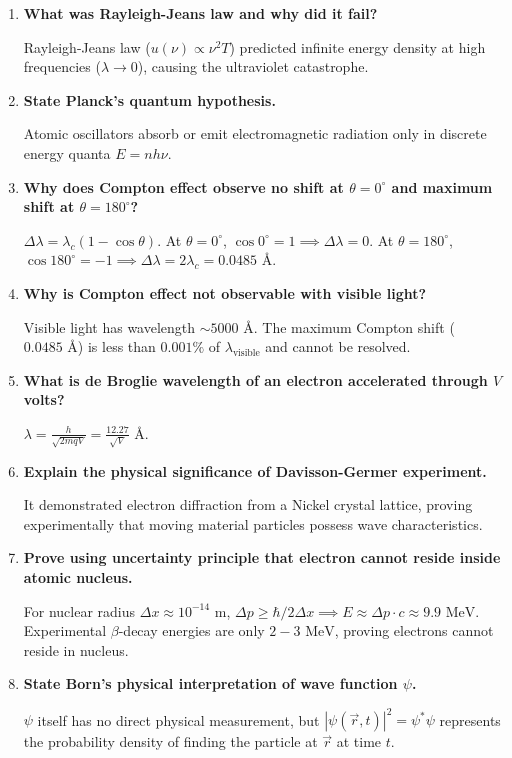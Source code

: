 \documentclass[12pt,a4paper]{article}
\newcommand{\Q}[1]{\textbf{#1}\par\noindent\ignorespaces}
\begin{document}
\begin{tcolorbox}[exambox, title={\textbf{Frequently Asked / Viva Questions}}]
\begin{enumerate}[topsep=0pt, label=\textbf{Q\arabic*.}, itemsep=5pt]
  \item \Q{What was Rayleigh-Jeans law and why did it fail?}
  Rayleigh-Jeans law ($u(\nu) \propto \nu^2 T$) predicted infinite energy density at high frequencies ($\lambda \to 0$), causing the ultraviolet catastrophe.

  \item \Q{State Planck's quantum hypothesis.}
  Atomic oscillators absorb or emit electromagnetic radiation only in discrete energy quanta $E = n h \nu$.

  \item \Q{Why does Compton effect observe no shift at $\theta = 0^\circ$ and maximum shift at $\theta = 180^\circ$?}
  $\Delta\lambda = \lambda_c (1 - \cos\theta)$. At $\theta = 0^\circ$, $\cos 0^\circ = 1 \implies \Delta\lambda = 0$. At $\theta = 180^\circ$, $\cos 180^\circ = -1 \implies \Delta\lambda = 2\lambda_c = 0.0485\text{ \AA}$.

  \item \Q{Why is Compton effect not observable with visible light?}
  Visible light has wavelength $\sim 5000\text{ \AA}$. The maximum Compton shift ($0.0485\text{ \AA}$) is less than $0.001\%$ of $\lambda_{\text{visible}}$ and cannot be resolved.

  \item \Q{What is de Broglie wavelength of an electron accelerated through $V$ volts?}
  $\lambda = \frac{h}{\sqrt{2m q V}} = \frac{12.27}{\sqrt{V}}\text{ \AA}$.

  \item \Q{Explain the physical significance of Davisson-Germer experiment.}
  It demonstrated electron diffraction from a Nickel crystal lattice, proving experimentally that moving material particles possess wave characteristics.

  \item \Q{Prove using uncertainty principle that electron cannot reside inside atomic nucleus.}
  For nuclear radius $\Delta x \approx 10^{-14}\text{ m}$, $\Delta p \ge \hbar / 2\Delta x \implies E \approx \Delta p \cdot c \approx 9.9\text{ MeV}$. Experimental $\beta$-decay energies are only $2-3\text{ MeV}$, proving electrons cannot reside in nucleus.

  \item \Q{State Born's physical interpretation of wave function $\psi$.}
  $\psi$ itself has no direct physical measurement, but $|\psi(\vec{r},t)|^2 = \psi^* \psi$ represents the probability density of finding the particle at $\vec{r}$ at time $t$.


\end{enumerate}
\end{tcolorbox}
\end{document}
